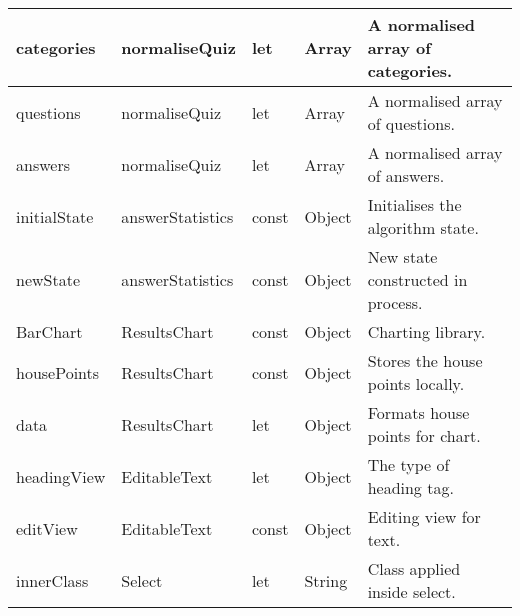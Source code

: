 \begin{longtable}{|l|l|l|l|l|}
categories                          & normaliseQuiz                        & let                                & Array                                & A normalised array of categories.     \\ \hline
questions                           & normaliseQuiz                        & let                                & Array                                & A normalised array of questions.      \\ \hline
answers                             & normaliseQuiz                        & let                                & Array                                & A normalised array of answers.        \\ \hline
initialState                        & answerStatistics                     & const                              & Object                               & Initialises the algorithm state.      \\ \hline
newState                            & answerStatistics                     & const                              & Object                               & New state constructed in process.     \\ \hline
BarChart                            & ResultsChart                         & const                              & Object                               & Charting library.                     \\ \hline
housePoints                         & ResultsChart                         & const                              & Object                               & Stores the house points locally.      \\ \hline
data                                & ResultsChart                         & let                                & Object                               & Formats house points for chart.       \\ \hline
headingView                         & EditableText                         & let                                & Object                               & The type of heading tag.              \\ \hline
editView                            & EditableText                         & const                              & Object                               & Editing view for text.                \\ \hline
innerClass                          & Select                               & let                                & String                               & Class applied inside select.          \\ \hline

\end{longtable}
